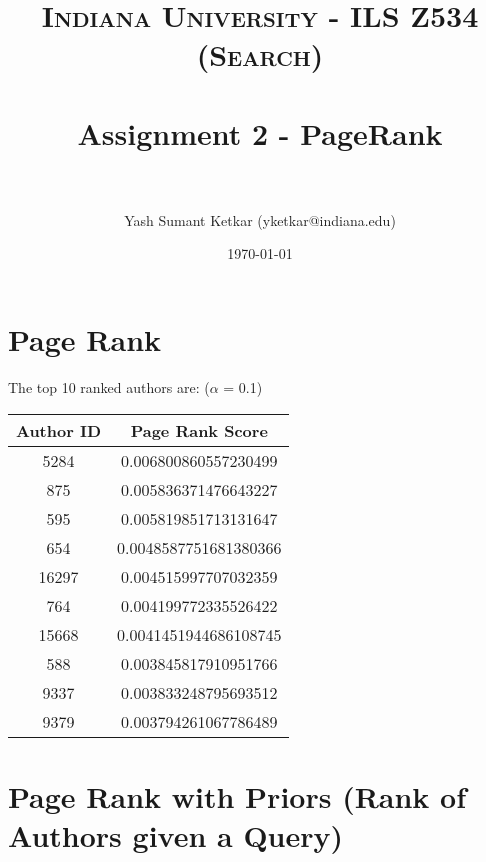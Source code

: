 \documentclass[paper=a4, fontsize=11pt]{scrartcl} %
\title{	
\normalfont \normalsize 
\textsc{Indiana University - ILS Z534 (Search)} \\ [25pt] %
\horrule{0.5pt} \\[0.4cm] %
\huge Assignment 2 - PageRank \\ %
\horrule{2pt} \\[0.5cm] %
}
\author{Yash Sumant Ketkar (yketkar@indiana.edu)} %
\date{\normalsize\today} %
\numberwithin{equation}{section} %
\numberwithin{figure}{section} %
\numberwithin{table}{section} %
\begin{document}
\maketitle %


\section{Page Rank}

The top 10 ranked authors are: ($\alpha$ = 0.1)
\begin{center}
 \begin{tabular}{||c | c||} 
 \hline
 Author ID & Page Rank Score\\ [0.5ex] 
 \hline\hline
 5284 & 0.006800860557230499\\ 
 \hline
 875 & 0.005836371476643227\\ 
 \hline
 595 & 0.005819851713131647\\ 
 \hline
 654 & 0.0048587751681380366\\ 
 \hline
 16297 & 0.004515997707032359\\ 
 \hline
 764 & 0.004199772335526422\\ 
 \hline
 15668 & 0.0041451944686108745\\ 
 \hline
 588 & 0.003845817910951766\\ 
 \hline
 9337 & 0.003833248795693512\\ 
 \hline
 9379 & 0.003794261067786489\\ [1ex]
 \hline
\end{tabular}
\end{center}

\newpage


\section{Page Rank with Priors (Rank of Authors given a Query)}

\end{document}

